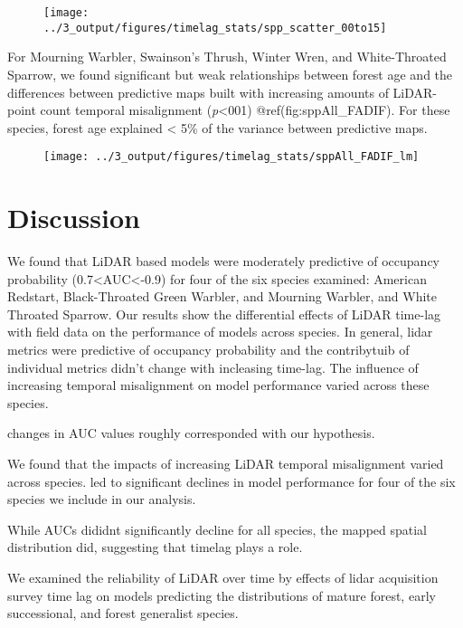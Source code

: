 \documentclass[
]{article}
\begin{document}
\begin{figure}[!ht]
\texttt{[image: ../3\_output/figures/timelag\_stats/spp\_scatter\_00to15]} \end{figure}

For Mourning Warbler, Swainson's Thrush, Winter Wren, and White-Throated Sparrow, we found significant but weak relationships between forest age and the differences between predictive maps built with increasing amounts of LiDAR-point count temporal misalignment (\emph{p}\textless001) @ref(fig:sppAll\_FADIF). For these species, forest age explained \textless{} 5\% of the variance between predictive maps.

\begin{figure}[!ht]
\texttt{[image: ../3\_output/figures/timelag\_stats/sppAll\_FADIF\_lm]} \end{figure}

\hypertarget{discussion}{%
\section{Discussion}\label{discussion}}

We found that LiDAR based models were moderately predictive of occupancy probability (0.7\textless AUC\textless-0.9) for four of the six species examined: American Redstart, Black-Throated Green Warbler, and Mourning Warbler, and White Throated Sparrow. Our results show the differential effects of LiDAR time-lag with field data on the performance of models across species. In general, lidar metrics were predictive of occupancy probability and the contribytuib of individual metrics didn't change with incleasing time-lag. The influence of increasing temporal misalignment on model performance varied across these species.

changes in AUC values roughly corresponded with our hypothesis.

We found that the impacts of increasing LiDAR temporal misalignment varied across species. led to significant declines in model performance for four of the six species we include in our analysis.

While AUCs dididnt significantly decline for all species, the mapped spatial distribution did, suggesting that timelag plays a role.

We examined the reliability of LiDAR over time by effects of lidar acquisition survey time lag on models predicting the distributions of mature forest, early successional, and forest generalist species.
\end{document}

